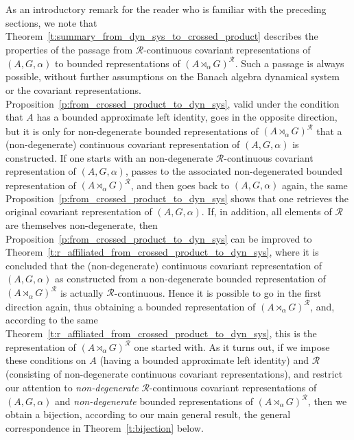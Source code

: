 \documentclass{amsart}
\theoremstyle{plain}
\theoremstyle{definition}
\numberwithin{equation}{section}
\begin{document}
As an introductory remark for the reader who is familiar with the preceding sections, we note that Theorem~\ref{t:summary_from_dyn_sys_to_crossed_product} describes the properties of the passage from ${\mathcal R}$-continuous covariant representations of ${(A,G,\alpha)}$ to bounded representations of ${(A {\rtimes}_\alpha G)^\mathcal{R}}$. Such a passage is always possible, without further assumptions on the Banach algebra dynamical system or the covariant representations. Proposition~\ref{p:from_crossed_product_to_dyn_sys}, valid under the condition that $A$ has a bounded approximate left identity, goes in the opposite direction, but it is only for non-degenerate bounded representations of ${(A {\rtimes}_\alpha G)^\mathcal{R}}$ that a (non-degenerate) continuous covariant representation of ${(A,G,\alpha)}$ is constructed. If one starts with an non-degenerate ${\mathcal R}$-continuous covariant representation of ${(A,G,\alpha)}$, passes to the associated non-degenerated bounded representation of ${(A {\rtimes}_\alpha G)^\mathcal{R}}$, and then goes back to ${(A,G,\alpha)}$ again, the same Proposition~\ref{p:from_crossed_product_to_dyn_sys} shows that one retrieves the original covariant representation of ${(A,G,\alpha)}$. If, in addition, all elements of ${\mathcal R}$ are themselves non-degenerate, then Proposition~\ref{p:from_crossed_product_to_dyn_sys} can be improved to Theorem~\ref{t:r_affiliated_from_crossed_product_to_dyn_sys}, where it is concluded that the (non-degenerate) continuous covariant representation of ${(A,G,\alpha)}$ as constructed from a non-degenerate bounded representation of ${(A {\rtimes}_\alpha G)^\mathcal{R}}$ is actually ${\mathcal R}$-continuous. Hence it is possible to go in the first direction again, thus obtaining a bounded representation of ${(A {\rtimes}_\alpha G)^\mathcal{R}}$, and, according to the same Theorem~\ref{t:r_affiliated_from_crossed_product_to_dyn_sys}, this is the representation of ${(A {\rtimes}_\alpha G)^\mathcal{R}}$ one started with. As it turns out, if we impose these conditions on $A$ (having a bounded approximate left identity) and ${\mathcal R}$ (consisting of non-degenerate continuous covariant representations), and restrict our attention to \emph{non-degenerate} ${\mathcal R}$-continuous covariant representations of ${(A,G,\alpha)}$ and \emph{non-degenerate} bounded representations of ${(A {\rtimes}_\alpha G)^\mathcal{R}}$, then we obtain a bijection, according to our main general result, the general correspondence in Theorem~\ref{t:bijection} below.
\end{document}
